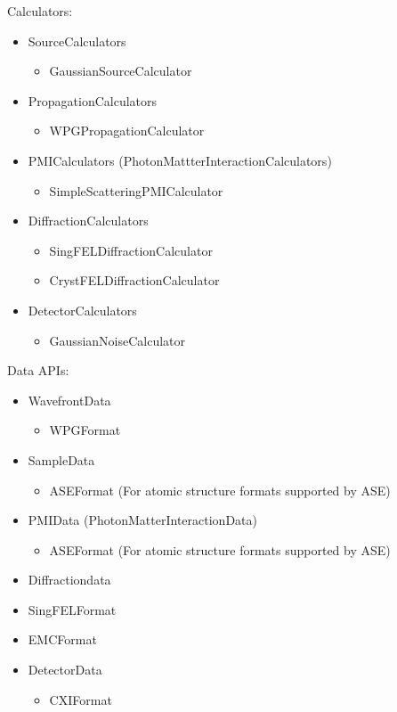 \documentclass[11pt, a4paper]{article}
\begin{document}
Calculators:
\begin{itemize}
    \item SourceCalculators
    \begin{itemize}
        \item GaussianSourceCalculator
    \end{itemize}
    \item PropagationCalculators
    \begin{itemize}
        \item WPGPropagationCalculator
    \end{itemize}
    \item PMICalculators (PhotonMattterInteractionCalculators)
    \begin{itemize}
        \item SimpleScatteringPMICalculator
    \end{itemize}
    \item DiffractionCalculators
    \begin{itemize}
        \item SingFELDiffractionCalculator
        \item CrystFELDiffractionCalculator
    \end{itemize}
    \item DetectorCalculators
    \begin{itemize}
        \item GaussianNoiseCalculator
    \end{itemize}
\end{itemize}

Data APIs:

\begin{itemize}
    \item WavefrontData
    \begin{itemize}
        \item WPGFormat
    \end{itemize}
    \item SampleData
    \begin{itemize}
        \item ASEFormat (For atomic structure formats supported by ASE)
    \end{itemize}
    \item PMIData (PhotonMatterInteractionData)
    \begin{itemize}
        \item ASEFormat (For atomic structure formats supported by ASE)
    \end{itemize}
    \item Diffractiondata
        \item SingFELFormat
        \item EMCFormat
    \item DetectorData
        \begin{itemize}
            \item CXIFormat
        \end{itemize}
\end{itemize}
\end{document}
